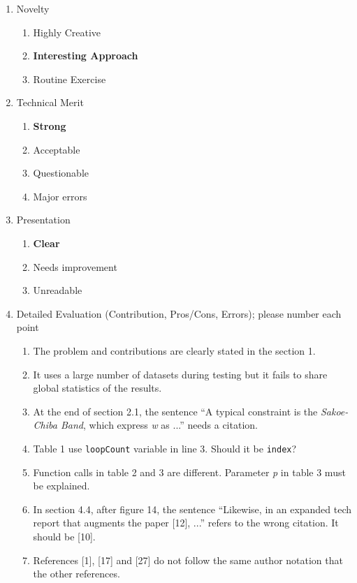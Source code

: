 \documentclass{article}
\begin{document}
\begin{enumerate}
 \item Novelty
 \begin{enumerate}[I]
  \item Highly Creative
  \item \textbf{Interesting Approach}
  \item Routine Exercise
 \end{enumerate} 
 
 \item Technical Merit
 \begin{enumerate}[I]
  \item \textbf{Strong}
  \item Acceptable
  \item Questionable
  \item Major errors
 \end{enumerate} 
 
 \item Presentation
 \begin{enumerate}[I]
  \item \textbf{Clear}
  \item Needs improvement
  \item Unreadable
 \end{enumerate}
 
 \item Detailed Evaluation (Contribution, Pros/Cons, Errors); please number each point
 \begin{framed}
  \begin{enumerate}
    \item The problem and contributions are clearly stated in the section 1.  
    \item It uses a large number of datasets during testing but it fails to share global statistics of the results.
    \item At the end of section 2.1, the sentence ``A typical constraint is the \textit{Sakoe-Chiba Band}, which express \textit{w} as ...'' needs a citation.
    \item Table 1 use \texttt{loopCount} variable in line 3. Should it be \texttt{index}?
    \item Function calls in table 2 and 3 are different.  Parameter \textit{p} in table 3 must be explained.
    \item In section 4.4, after figure 14, the sentence ``Likewise, in an expanded tech report that augments the paper [12], ...'' refers to the wrong citation. It should be [10].
    \item References [1], [17] and [27] do not follow the same author notation that the other references.
  \end{enumerate}
 \end{framed}
 

\end{enumerate}
\end{document}
